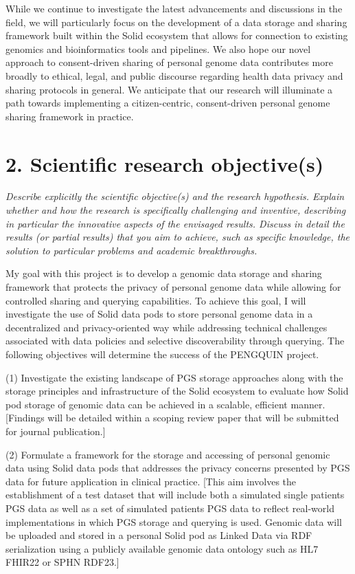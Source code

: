 \documentclass{article}
\begin{document}
While we continue to investigate the latest advancements and discussions in the field, we will particularly focus on the development of a data storage and sharing framework built within the Solid ecosystem that allows for connection to existing genomics and bioinformatics tools and pipelines. We also hope our novel approach to consent-driven sharing of personal genome data contributes more broadly to ethical, legal, and public discourse regarding health data privacy and sharing protocols in general. We anticipate that our research will illuminate a path towards implementing a citizen-centric, consent-driven personal genome sharing framework in practice.


\section{2. Scientific research objective(s)}
\textit{Describe explicitly the scientific objective(s) and the research hypothesis. Explain whether and how the research is specifically challenging and inventive, describing in particular the innovative aspects of the envisaged results. Discuss in detail the results (or partial results) that you aim to achieve, such as specific knowledge, the solution to particular problems and academic breakthroughs.}

My goal with this project is to develop a genomic data storage and sharing framework that protects the privacy of personal genome data while allowing for controlled sharing and querying capabilities. To achieve this goal, I will investigate the use of Solid data pods to store personal genome data in a decentralized and privacy-oriented way while addressing technical challenges associated with data policies and selective discoverability through querying. The following objectives will determine the success of the PENGQUIN project.

(1) Investigate the existing landscape of PGS storage approaches along with the storage principles and infrastructure of the Solid ecosystem to evaluate how Solid pod storage of genomic data can be achieved in a scalable, efficient manner. [Findings will be detailed within a scoping review paper that will be submitted for journal publication.]

(2) Formulate a framework for the storage and accessing of personal genomic data using Solid data pods that addresses the privacy concerns presented by PGS data for future application in clinical practice. [This aim involves the establishment of a test dataset that will include both a simulated single patient\textquotesingle s PGS data as well as a set of simulated patient\textquotesingle s PGS data to reflect real-world implementations in which PGS storage and querying is used. Genomic data will be uploaded and stored in a personal Solid pod as Linked Data via RDF serialization using a publicly available genomic data ontology such as HL7 FHIR22 or SPHN RDF23.]
\end{document}
